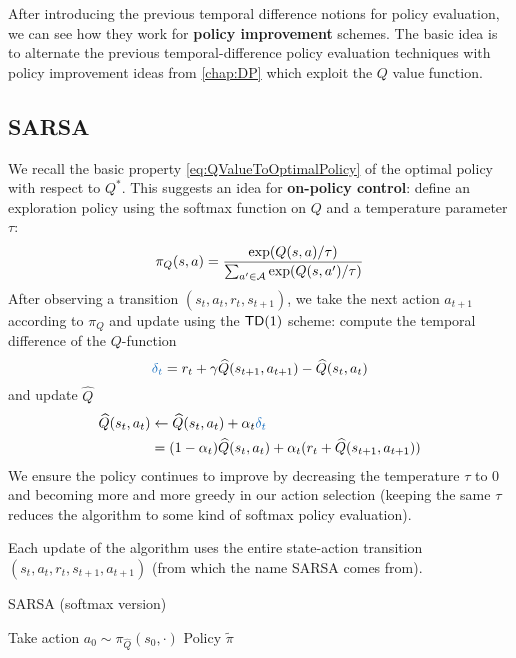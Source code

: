 \documentclass[../course-notes.tex]{subfiles}
\begin{document}
After introducing the previous temporal difference notions for policy evaluation, we can see how they work for \textbf{policy improvement} schemes. The basic idea is to alternate the previous temporal-difference policy evaluation techniques with policy improvement ideas from \cref{chap:DP} which exploit the $Q$ value function.

\subsection{SARSA}

We recall the basic property \eqref{eq:QValueToOptimalPolicy} of the optimal policy with respect to $Q^*$. This suggests an idea for \textbf{on-policy control}: define an exploration policy using the softmax function on $Q$ and a temperature parameter $\tau$:
\[
	\pi_Q(s,a) =
	\frac{\exp(Q(s,a)/\tau)}{
		\sum_{a'\in\mathcal{A}} \exp(Q(s,a')/\tau)
	}
\]
After observing a transition $(s_t, a_t, r_t, s_{t+1})$, we take the next action $a_{t+1}$ according to $\pi_Q$ and update using the $\mathsf{TD}(1)$ scheme: compute the temporal difference of the $Q$-function
\begin{equation}\label{eq:QfuncTDerror}
	{\bluefont \delta_t} = r_t + \gamma \widehat{Q}(s_{t+1}, a_{t+1}) - \widehat{Q}(s_t, a_t)
\end{equation}
and update $\widehat{Q}$
\begin{equation*}
\begin{aligned}
	\widehat{Q}(s_t, a_t) &\leftarrow
	\widehat{Q}(s_t, a_t) + \alpha_t {\bluefont \delta_t}  \\
	&= (1-\alpha_t)\widehat{Q}(s_t, a_t)
	+ \alpha_t (r_t + \widehat{Q}(s_{t+1}, a_{t+1}))
\end{aligned}
\end{equation*}
We ensure the policy continues to improve by decreasing the temperature $\tau$ to 0 and becoming more and more greedy in our action selection (keeping the same $\tau$ reduces the algorithm to some kind of softmax policy evaluation).

Each update of the algorithm uses the entire state-action transition $(s_t,a_t,r_t,s_{t+1},a_{t+1})$ (from which the name SARSA comes from).

\begin{algorithm}
	\caption{SARSA (softmax version)}
	Take action $a_0 \sim \pi_{\widehat{Q}}(s_0, \cdot)$\;
	\Return Policy $\tilde{\pi}$\;
\end{algorithm}
\end{document}
